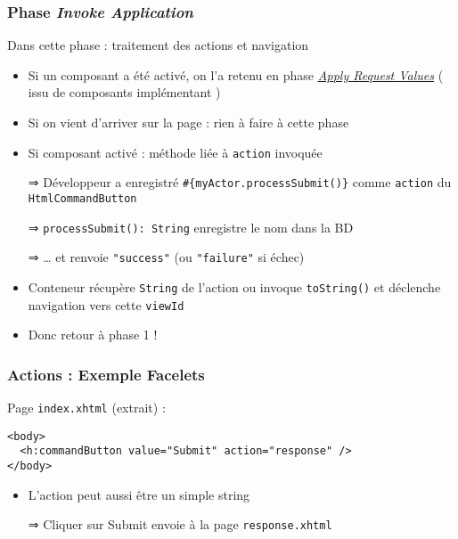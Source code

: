 \documentclass[english, french]{beamer}
\begin{document}
\begin{frame}[label=ph-ia]
	\frametitle{Phase \emph{Invoke Application}}
	Dans cette phase : traitement des actions et navigation
	\begin{itemize}
		\item Si un composant a été activé, on l’a retenu en phase \hyperlink{ph-arv}{\emph{Apply Request Values}} {\tiny ( issu de composants implémentant )}
		\item Si on vient d’arriver sur la page : rien à faire à cette phase
		\item Si composant activé : méthode liée à \texttt{action} invoquée
		\item[⇒] Développeur a enregistré \texttt{\#\{myActor.processSubmit()\}} comme \texttt{action} du \texttt{HtmlCommandButton}
		\item[⇒] \texttt{processSubmit(): String} enregistre le nom dans la BD
		\item[⇒] … et renvoie \texttt{"success"} (ou \texttt{"failure"} si échec)
		\item Conteneur récupère \texttt{String} de l’action {\tiny ou invoque \texttt{toString()}} et déclenche navigation vers cette \texttt{viewId}
		\item Donc \alert{retour à phase 1 !}
	\end{itemize}
\end{frame}

\begin{frame}[fragile]
	\frametitle{Actions : Exemple Facelets}
	Page \texttt{index.xhtml} (extrait) :
	\begin{lstlisting}[aboveskip=1em, belowskip=1em]
<body>
  <h:commandButton value="Submit" action="response" />
</body>
	\end{lstlisting}
	\begin{itemize}
		\item L’action peut aussi être un simple string
		\item[⇒] Cliquer sur Submit envoie à la page \texttt{response.xhtml}
	\end{itemize}
\end{frame}
\end{document}
